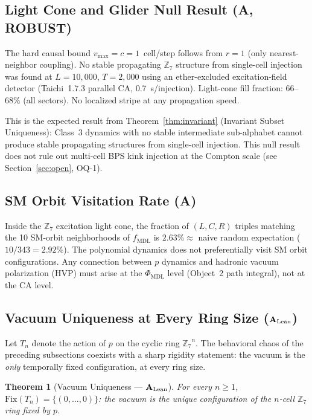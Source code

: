 \documentclass[11pt]{article}
\newtheorem{theorem}{Theorem}[section]
\theoremstyle{remark}
\newcommand{\PHIMDL}{\ensuremath{\Phi_{\mathrm{MDL}}}}
\newcommand{\ZS}{\ensuremath{\mathbb{Z}_7}}
\newcommand{\fmdl}{\ensuremath{f_{\mathrm{MDL}}}}
\newcommand{\CatA}{\textbf{A}}
\newcommand{\CatAL}{\texorpdfstring{\ensuremath{\textbf{A}_{\rm Lean}}}{A-Lean}}
\begin{document}
\subsection{Light Cone and Glider Null Result (\CatA{}, ROBUST)}

The hard causal bound $v_{\max} = c = 1$~cell/step follows from $r = 1$ (only
nearest-neighbor coupling). No stable propagating $\ZS$ structure from
single-cell injection was found at $L{=}10{,}000$, $T{=}2{,}000$ using an
ether-excluded excitation-field detector (Taichi~1.7.3 parallel CA,
0.7~s/injection). Light-cone fill fraction: $66$--$68\%$ (all sectors). No
localized stripe at any propagation speed.

This is the expected result from Theorem~\ref{thm:invariant} (Invariant Subset
Uniqueness): Class~3 dynamics with no stable intermediate sub-alphabet cannot
produce stable propagating structures from single-cell injection. This null
result does not rule out multi-cell BPS kink injection at the Compton scale
(see Section~\ref{sec:open}, OQ-1).

\subsection{SM Orbit Visitation Rate (\CatA{})}

Inside the $\ZS$ excitation light cone, the fraction of $(L,C,R)$ triples
matching the 10 SM-orbit neighborhoods of $\fmdl{}$ is $2.63\% \approx$ naive
random expectation ($10/343 = 2.92\%$). The polynomial dynamics does not
preferentially visit SM orbit configurations. Any connection between $p$ dynamics
and hadronic vacuum polarization (HVP) must arise at the $\PHIMDL{}$ level
(Object~2 path integral), not at the CA level.

\subsection{Vacuum Uniqueness at Every Ring Size (\CatAL{})}
\label{subsec:vacuum-uniqueness}

Let $T_n$ denote the action of $p$ on the cyclic ring $\ZS^n$. The
behavioral chaos of the preceding subsections coexists with a sharp
rigidity statement: the vacuum is the \emph{only} temporally fixed
configuration, at every ring size.

\begin{theorem}[Vacuum Uniqueness --- \CatAL{}]
\label{thm:vacuumuniqueness}
For every $n \geq 1$, $\mathrm{Fix}(T_n) = \{(0,\ldots,0)\}$: the vacuum is
the unique configuration of the $n$-cell $\ZS$ ring fixed by $p$.
\end{theorem}
\end{document}
